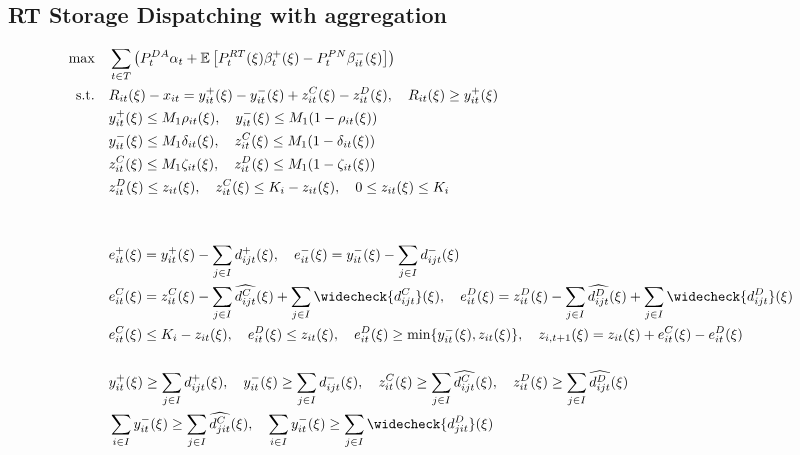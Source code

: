 \documentclass[10pt]{article}
\begin{document}
\newpage

\subsection{RT Storage Dispatching with aggregation}
\begin{align*}
    \text{max} \quad &\sum_{t\in T}\left(P_t^{DA} \alpha_{t} + \mathbb{E}\left[P_t^{RT}(\xi)\beta_{t}^{+}(\xi) - P_t^{PN}\beta_{it}^{-}(\xi)\right]\right)&\\    
    \text{s.t.} \quad &R_{it}(\xi) - x_{it} = y_{it}^{+}(\xi) - y_{it}^{-}(\xi) + z^C_{it}(\xi) - z^D_{it}(\xi), \quad R_{it}(\xi) \geq y^+_{it}(\xi)&\\
    &y^+_{it}(\xi) \leq M_1 \rho_{it}(\xi), \quad y^-_{it}(\xi) \leq M_1 (1 - \rho_{it}(\xi)) &\\
    &y^-_{it}(\xi) \leq M_1 \delta_{it}(\xi), \quad z^C_{it}(\xi) \leq M_1 (1 - \delta_{it}(\xi)) &\\
    &z^C_{it}(\xi) \leq M_1 \zeta_{it}(\xi), \quad z^D_{it}(\xi) \leq M_1 (1 - \zeta_{it}(\xi)) &\\
    &z^D_{it}(\xi) \le z_{it}(\xi), \quad z^C_{it}(\xi) \le K_i-z_{it}(\xi), \quad 0 \leq z_{it}(\xi) \leq K_i &\\
    &&\\ 
    &&\\
    &e^+_{it}(\xi) = y^+_{it}(\xi) - \sum_{j \in I}d^{+}_{ijt}(\xi), \quad e^-_{it}(\xi) = y^-_{it}(\xi) - \sum_{j \in I}d^{-}_{ijt}(\xi) &\\
    &e^C_{it}(\xi) = z^C_{it}(\xi) - \sum_{j \in I}\widehat{d^{C}_{ijt}}(\xi) + \sum_{j \in I}\widecheck{d^{C}_{ijt}}(\xi), \quad e^D_{it}(\xi) = z^D_{it}(\xi) - \sum_{j \in I}\widehat{d^{D}_{ijt}}(\xi) + \sum_{j \in I}\widecheck{d^{D}_{ijt}}(\xi) &\\
    &e^C_{it}(\xi) \leq K_i - z_{it}(\xi), \quad e^D_{it}(\xi) \leq z_{it}(\xi), \quad e^D_{it}(\xi) \geq \text{min} \{y^-_{it}(\xi), z_{it}(\xi) \}, \quad z_{i,t+1}(\xi) = z_{it}(\xi) + e^C_{it}(\xi) - e^D_{it}(\xi) &\\
    &&\\
    &y^+_{it}(\xi) \geq \sum_{j \in I}d^+_{ijt}(\xi), \quad y^-_{it}(\xi) \geq \sum_{j \in I}d^{-}_{ijt}(\xi), \quad z^C_{it}(\xi) \geq \sum_{j \in I}\widehat{d^{C}_{ijt}}(\xi), \quad z^D_{it}(\xi) \geq \sum_{j \in I}\widehat{d^{D}_{ijt}}(\xi)&\\
    &\sum_{i \in I}y^-_{it}(\xi) \geq \sum_{j \in I}\widehat{d^{C}_{jit}}(\xi), \quad \sum_{i \in I}y^-_{it}(\xi) \geq \sum_{j \in I}\widecheck{d^{D}_{jit}}(\xi)&\\

\end{align*}
\end{document}
